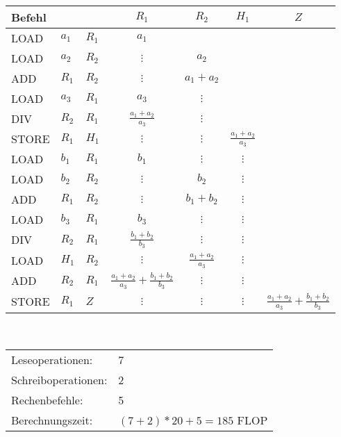 \documentclass[a4paper,11pt]{article}
\newcommand{\ditto}{$\vdots$}
\newcommand{\Frac}[2]{\frac{#1}{#2}}
\begin{document}
\begin{enumerate}
    \begin{tabular}{lll|c|c|c|c}
        Befehl & & & $R_1$ & $R_2$ & $H_1$ & $Z$ \\ \hline
        LOAD & $a_1$ & $R_1$ & $a_1$ & & & \\
        LOAD & $a_2$ & $R_2$ & \ditto & $a_2$ & & \\
        ADD  & $R_1$ & $R_2$ & \ditto & $a_1 + a_2$ & & \\
        LOAD & $a_3$ & $R_1$ & $a_3$ & \ditto & & \\
        DIV  & $R_2$ & $R_1$ & $\Frac{a_1 + a_2}{a_3}$ & \ditto & & \\
        STORE& $R_1$ & $H_1$ & \ditto & \ditto & $\Frac{a_1 + a_2}{a_3}$ & \\
        LOAD & $b_1$ & $R_1$ & $b_1$ & \ditto & \ditto & \\
        LOAD & $b_2$ & $R_2$ & \ditto & $b_2$ & \ditto & \\
        ADD  & $R_1$ & $R_2$ & \ditto & $b_1 + b_2$ & \ditto & \\
        LOAD & $b_3$ & $R_1$ & $b_3$ & \ditto & \ditto & \\
        DIV  & $R_2$ & $R_1$ & $\Frac{b_1 + b_2}{b_3}$ & \ditto & \ditto & \\
        LOAD & $H_1$ & $R_2$ & \ditto & $\Frac{a_1 + a_2}{a_3}$ & \ditto & \\
        ADD  & $R_2$ & $R_1$ & $\Frac{a_1 + a_2}{a_3} + \Frac{b_1 + b_2}{b_3}$ & \ditto & \ditto & \\
        STORE& $R_1$ & $Z$   & \ditto & \ditto & \ditto & $\Frac{a_1 + a_2}{a_3} + \Frac{b_1 + b_2}{b_3}$
    \end{tabular}\\[10pt]

    \begin{tabular}{ll}
    Leseoperationen:& 7 \\
    Schreiboperationen:& 2 \\
    Rechenbefehle:& 5\\
    Berechnungszeit:& $(7+2)*20 + 5 = 185$ FLOP
    \end{tabular}


\end{enumerate}
\end{document}
